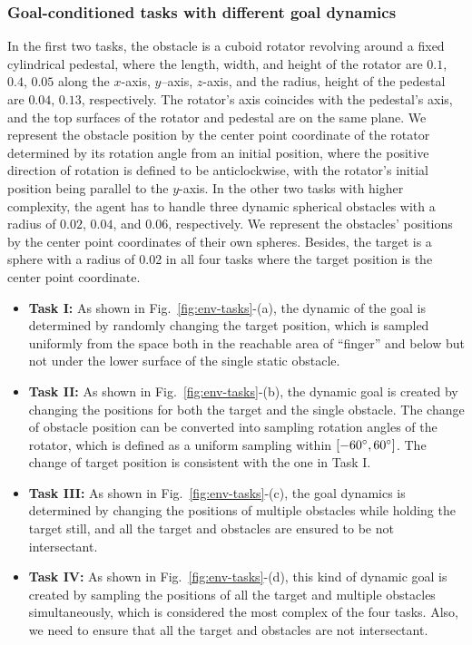 \documentclass[journal]{IEEEtran}
\begin{document}
\subsubsection{Goal-conditioned tasks with different goal dynamics}
In the first two tasks, the obstacle is a cuboid rotator revolving around a fixed cylindrical pedestal, where the length, width, and height of the rotator are $0.1$, $0.4$, $0.05$ along the $x$-axis, $y$--axis, $z$-axis, and the radius, height of the pedestal are $0.04$, $0.13$, respectively. The rotator's axis coincides with the pedestal's axis, and the top surfaces of the rotator and pedestal are on the same plane.
We represent the obstacle position by the center point coordinate of the rotator determined by its rotation angle from an initial position, where the positive direction of rotation is defined to be anticlockwise, with the rotator's initial position being parallel to the $y$-axis.
In the other two tasks with higher complexity, the agent has to handle three dynamic spherical obstacles with a radius of $0.02$, $0.04$, and $0.06$, respectively. We represent the obstacles' positions by the center point coordinates of their own spheres.
Besides, the target is a sphere with a radius of 0.02 in all four tasks where the target position is the center point coordinate.



\begin{itemize}[leftmargin=1em]
\item \textbf{Task I:} As shown in Fig.~\ref{fig:env-tasks}-(a), the dynamic of the goal is determined by randomly changing the target position, which is sampled uniformly from the space both in the reachable area of “finger” and below but not under the lower surface of the single static obstacle.
\item \textbf{Task II:} As shown in Fig.~\ref{fig:env-tasks}-(b), the dynamic goal is created by changing the positions for both the target and the single obstacle. The change of obstacle position can be converted into sampling rotation angles of the rotator, which is defined as a uniform sampling within $[-60\degree, 60\degree]$. The change of target position is consistent with the one in Task I.
\item \textbf{Task III:} As shown in Fig.~\ref{fig:env-tasks}-(c), the goal dynamics is determined by changing the positions of multiple obstacles while holding the target still, and all the target and obstacles are ensured to be not intersectant.
\item \textbf{Task IV:} As shown in Fig.~\ref{fig:env-tasks}-(d), this kind of dynamic goal is created by sampling the positions of all the target and multiple obstacles simultaneously, which is considered the most complex of the four tasks. Also, we need to ensure that all the target and obstacles are not intersectant.
\end{itemize}
\end{document}
